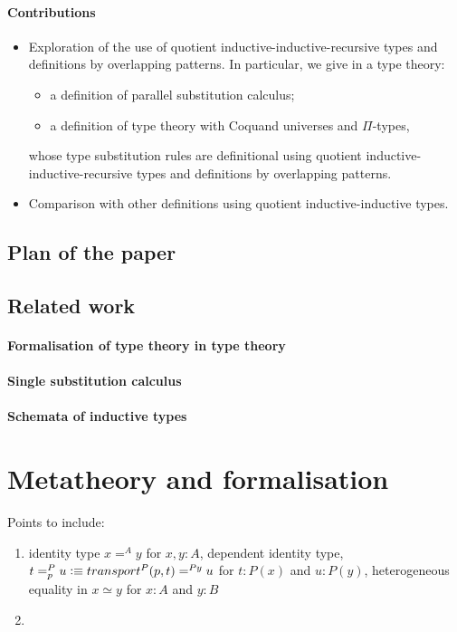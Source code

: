 \documentclass[a4paper,UKenglish,numberwithinsect,cleveref,thm-restate]{lipics-v2021}
\begin{document}
\paragraph*{Contributions}
\begin{itemize}
  \item Exploration of the use of quotient inductive-inductive-recursive types and definitions by overlapping patterns.
    In particular, we give in a type theory:
    \begin{itemize}
      \item a definition of parallel substitution calculus;
      \item a definition of type theory with Coquand universes and $\Pi$-types,
    \end{itemize}
   whose type substitution rules are definitional using quotient inductive-inductive-recursive types and definitions by overlapping patterns.
  \item Comparison with other definitions using quotient inductive-inductive types.
\end{itemize}


\subsection{Plan of the paper}
\subsection{Related work}
\paragraph*{Formalisation of type theory in type theory}
\cite{Danielsson2006,Altenkirch2016a}
\cite{Altenkirch2017}

\paragraph*{Single substitution calculus}
\cite{Kaposi2023,Kaposi2024a}
\paragraph*{Schemata of inductive types}
\cite{Kaposi2019}

\section{Metatheory and formalisation}
\cite{Pujet2022,Pujet2024,Pujet2022a}
Points to include:
\begin{enumerate}
  \item identity type $x =^{A} y$ for $x, y : A$, dependent identity type, $t =^{P}_{p} u \defeq \transfib{P}{p}{t} =^{P y} u$ for $t : P(x)$ and $u : P(y)$, heterogeneous equality in \Agda $x \simeq y$ for $x : A$ and $y : B$
  \item 
\end{enumerate}
\end{document}
